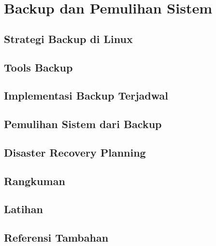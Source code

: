 
\chapter{Backup dan Pemulihan Sistem}
\label{ch:backup-and-recovery}

\begin{abstract}
Bab ini membahas strategi backup di Linux, tools backup, implementasi backup
terjadwal, dan disaster recovery planning.
\end{abstract}

\section{Strategi Backup di Linux}
\section{Tools Backup}
\section{Implementasi Backup Terjadwal}
\section{Pemulihan Sistem dari Backup}
\section{Disaster Recovery Planning}
\section{Rangkuman}
\section{Latihan}
\section{Referensi Tambahan}
